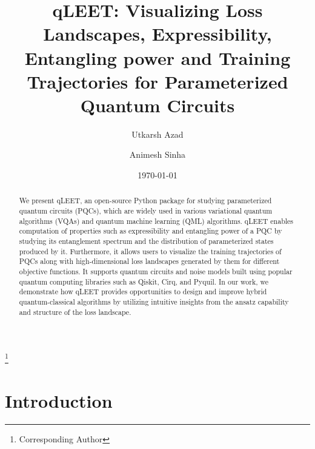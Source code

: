 \documentclass[%
 reprint,
 amsmath,
 amssymb,
 showkeys,
 pra,
 floatfix,
]{revtex4-2}
\begin{document}

\title{qLEET: Visualizing Loss Landscapes, Expressibility, Entangling power and Training Trajectories for Parameterized Quantum Circuits}

\author{Utkarsh Azad}
\thanks{Corresponding Author}
\author{Animesh Sinha}

%

\date{\today}%

\begin{abstract}

    We present qLEET, an open-source Python package for studying parameterized quantum circuits (PQCs), which are widely used in various variational quantum algorithms (VQAs) and quantum machine learning (QML) algorithms. qLEET enables computation of properties such as expressibility and entangling power of a PQC by studying its entanglement spectrum and the distribution of parameterized states produced by it. Furthermore, it allows users to visualize the training trajectories of PQCs along with high-dimensional loss landscapes generated by them for different objective functions. It supports quantum circuits and noise models built using popular quantum computing libraries such as Qiskit, Cirq, and Pyquil. In our work, we demonstrate how qLEET provides opportunities to design and improve hybrid quantum-classical algorithms by utilizing intuitive insights from the ansatz capability and structure of the loss landscape.

\end{abstract}

\maketitle


\section{\label{sec:intro}Introduction}
\end{document}
